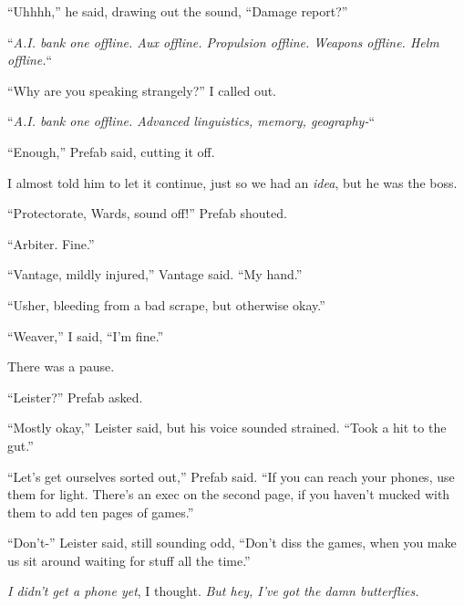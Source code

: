 ``Uhhhh,'' he said, drawing out the sound, ``Damage report?''



``\emph{A.I. bank one offline.  Aux offline.  Propulsion offline.  Weapons offline.  Helm offline.}``



``Why are you speaking strangely?''  I called out.



``\emph{A.I. bank one offline.  Advanced linguistics, memory, geography-}``



``Enough,'' Prefab said, cutting it off.



I almost told him to let it continue, just so we had an \emph{idea}, but he was the boss.



``Protectorate, Wards, sound off!''  Prefab shouted.



``Arbiter.  Fine.''



``Vantage, mildly injured,'' Vantage said.  ``My hand.''



``Usher, bleeding from a bad scrape, but otherwise okay.''



``Weaver,'' I said, ``I'm fine.''



There was a pause.



``Leister?''  Prefab asked.



``Mostly okay,'' Leister said, but his voice sounded strained.  ``Took a hit to the gut.''



``Let's get ourselves sorted out,'' Prefab said.  ``If you can reach your phones, use them for light.  There's an exec on the second page, if you haven't mucked with them to add ten pages of games.''



``Don't-'' Leister said, still sounding odd, ``Don't diss the games, when you make us sit around waiting for stuff all the time.''



\emph{I didn't get a phone yet}, I thought.  \emph{But hey, I've got the damn butterflies.}



